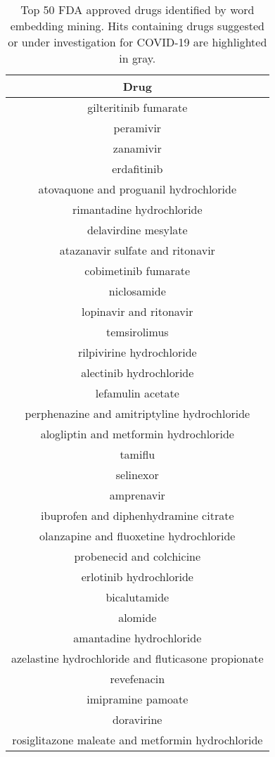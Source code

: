 \documentclass{article}
\newcommand{\lgc}[1]{\cellcolor[gray]{0.85}#1}
\begin{document}
\begin{table}[t!]
\footnotesize
\centering
\caption{Top 50 FDA approved drugs identified by word embedding mining. Hits containing drugs suggested or under investigation for COVID-19 are highlighted in gray.}
\label{tab:drugs_top50}
\begin{tabular}[t]{c}
\hline
Drug \\
\hline
gilteritinib fumarate \\
peramivir \\
zanamivir \\
erdafitinib \\
atovaquone and proguanil hydrochloride \\
rimantadine hydrochloride \\
delavirdine mesylate \\
\lgc{atazanavir sulfate and ritonavir\cite{cao2020trial}} \\
cobimetinib fumarate \\
\lgc{niclosamide\cite{xu2020broad}} \\
\lgc{lopinavir and ritonavir\cite{cao2020trial}} \\
temsirolimus \\
rilpivirine hydrochloride \\
alectinib hydrochloride \\
lefamulin acetate \\
perphenazine and amitriptyline hydrochloride \\
alogliptin and metformin hydrochloride \\
tamiflu \\
selinexor \\
amprenavir \\
ibuprofen and diphenhydramine citrate \\
olanzapine and fluoxetine hydrochloride \\
\lgc{probenecid and colchicine\cite{colcorona}} \\
erlotinib hydrochloride \\
bicalutamide \\
alomide \\
amantadine hydrochloride \\
\lgc{azelastine hydrochloride and fluticasone propionate\cite{mccreary2020coronavirus}} \\
revefenacin \\
imipramine pamoate \\
doravirine \\
rosiglitazone maleate and metformin hydrochloride \\

\end{tabular}
\end{table}
\end{document}
